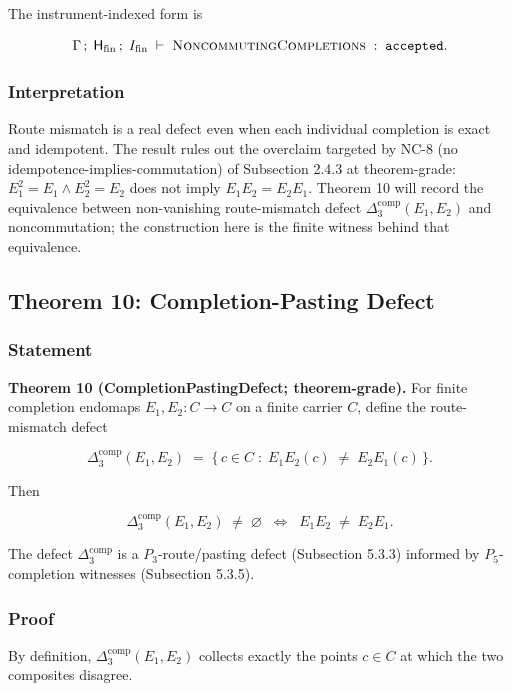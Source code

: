 \documentclass[11pt]{article}
\theoremstyle{definition}
\begin{document}
The instrument-indexed form is

\[
\Gamma\,;\;\mathsf H_{\mathrm{fin}}\,;\;I_{\mathrm{fin}}\;\vdash\;\textsc{NoncommutingCompletions}\;:\;\texttt{accepted}.
\]

\subsubsection{Interpretation}

Route mismatch is a real defect even when each individual completion is exact and idempotent. The result rules out the overclaim targeted by NC-8 (no idempotence-implies-commutation) of Subsection 2.4.3 at theorem-grade: \(E_1^2=E_1\wedge E_2^2=E_2\) does not imply \(E_1E_2=E_2E_1\). Theorem 10 will record the equivalence between non-vanishing route-mismatch defect \(\Delta_3^{\mathrm{comp}}(E_1,E_2)\) and noncommutation; the construction here is the finite witness behind that equivalence.

\subsection{Theorem 10: Completion-Pasting Defect}

\subsubsection{Statement}

\textbf{Theorem 10 (CompletionPastingDefect; theorem-grade).} For finite completion endomaps \(E_1,E_2:C\to C\) on a finite carrier \(C\), define the route-mismatch defect

\[
\Delta_3^{\mathrm{comp}}(E_1,E_2)\;=\;\{\,c\in C\;:\;E_1E_2(c)\;\neq\;E_2E_1(c)\,\}.
\]

Then

\[
\Delta_3^{\mathrm{comp}}(E_1,E_2)\;\neq\;\varnothing\;\;\Longleftrightarrow\;\;E_1E_2\;\neq\;E_2E_1.
\]

The defect \(\Delta_3^{\mathrm{comp}}\) is a \(P_3\)-route/pasting defect (Subsection 5.3.3) informed by \(P_5\)-completion witnesses (Subsection 5.3.5).

\subsubsection{Proof}

By definition, \(\Delta_3^{\mathrm{comp}}(E_1,E_2)\) collects exactly the points \(c\in C\) at which the two composites disagree.
\end{document}
